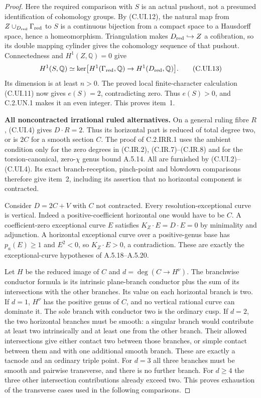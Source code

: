 \begin{proof}
Here the required comparison with $S$ is an
actual pushout, not a presumed identification
of cohomology groups. By (C.UI.12), the natural
map from
$Z\cup_{D_{\rm red}}\Gamma_{\rm red}$ to $S$
is a continuous bijection from a compact space
to a Hausdorff space, hence a homeomorphism.
Triangulation makes $D_{\rm red}\hookrightarrow Z$
a cofibration, so its double mapping cylinder
gives the cohomology sequence of that pushout.
Connectedness and $H^1(Z,\mathbb Q)=0$ give
\[
 H^1(S,\mathbb Q)
  \simeq\ker\bigl[H^1(\Gamma_{\rm red},\mathbb Q)
                       \to H^1(D_{\rm red},\mathbb Q)\bigr].
 \tag{C.UI.13}
\]
Its dimension is at least $n>0$. The proved
local finite-character calculation (C.UI.11)
now gives $e(S)=2$, contradicting zero.
Thus $e(S)>0$, and C.2.UN.1 makes it an even
integer. This proves item~1.

\par\medskip\noindent\textbf{All noncontracted irrational ruled alternatives.}\quad
On a general ruling fibre $R$, (C.UI.4) gives
$D\cdot R=2$. Thus its horizontal part is reduced
of total degree two, or is $2C$ for a smooth
section $C$. The proof of C.2.IRR.1 uses the
ambient condition only for the zero degrees
in (C.IR.2), (C.IR.7)--(C.IR.8) and for the
torsion-canonical, zero-$\chi$ genus bound A.5.14.
All are furnished by (C.UI.2)--(C.UI.4).
Its exact branch-reception, pinch-point and
blowdown comparisons therefore give item~2,
including its assertion that no horizontal
component is contracted.

Consider $D=2C+V$ with $C$ not contracted.
Every resolution-exceptional curve is vertical.
Indeed a positive-coefficient horizontal one
would have to be $C$. A coefficient-zero
exceptional curve $E$ satisfies
$K_Z\cdot E=D\cdot E=0$ by minimality and
adjunction. A horizontal exceptional curve over
a positive-genus base has $p_a(E)\ge1$ and
$E^2<0$, so $K_Z\cdot E>0$, a contradiction.
These are exactly the exceptional-curve
hypotheses of A.5.18--A.5.20.

Let $H$ be the reduced image of $C$ and
$d=\deg(C\to H^\nu)$. The branchwise conductor
formula is its intrinsic plane-branch conductor
plus the sum of its intersections with the
other branches. Its value on each horizontal
branch is two. If $d=1$, $H^\nu$ has the
positive genus of $C$, and no vertical rational
curve can dominate it. The sole branch with
conductor two is the ordinary cusp. If $d=2$,
the two horizontal branches must be smooth:
a singular branch would contribute at least two
intrinsically and at least one from the other
branch. Their allowed intersections give either
contact two between those branches, or simple
contact between them and with one additional
smooth branch. These are exactly a tacnode and
an ordinary triple point. For $d=3$ all three
branches must be smooth and pairwise transverse,
and there is no further branch. For $d\ge4$
the three other intersection contributions
already exceed two. This proves exhaustion
of the transverse cases used in the following
comparisons.


\end{proof}
